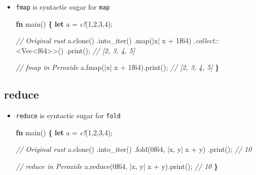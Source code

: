 \documentclass[]{book}
\newenvironment{Shaded}{\begin{snugshade}}{\end{snugshade}}
\newcommand{\CommentTok}[1]{\textcolor[rgb]{0.56,0.35,0.01}{\textit{#1}}}
\newcommand{\DataTypeTok}[1]{\textcolor[rgb]{0.13,0.29,0.53}{#1}}
\newcommand{\DecValTok}[1]{\textcolor[rgb]{0.00,0.00,0.81}{#1}}
\newcommand{\KeywordTok}[1]{\textcolor[rgb]{0.13,0.29,0.53}{\textbf{#1}}}
\newcommand{\NormalTok}[1]{#1}
\newcommand{\OperatorTok}[1]{\textcolor[rgb]{0.81,0.36,0.00}{\textbf{#1}}}
\newcommand{\PreprocessorTok}[1]{\textcolor[rgb]{0.56,0.35,0.01}{\textit{#1}}}
\begin{document}
\begin{itemize}
\item
  \texttt{fmap} is syntactic sugar for \texttt{map}

\begin{Shaded}
\begin{Highlighting}[]
\KeywordTok{fn}\NormalTok{ main() }\OperatorTok{\{}
    \KeywordTok{let}\NormalTok{ a = }\PreprocessorTok{c!}\NormalTok{(}\DecValTok{1}\NormalTok{,}\DecValTok{2}\NormalTok{,}\DecValTok{3}\NormalTok{,}\DecValTok{4}\NormalTok{);}

    \CommentTok{// Original rust}
\NormalTok{    a.clone()}
\NormalTok{        .into_iter()}
\NormalTok{        .map(|x| x + }\DecValTok{1f64}\NormalTok{)}
\NormalTok{        .}\PreprocessorTok{collect::}\NormalTok{<}\DataTypeTok{Vec}\NormalTok{<}\DataTypeTok{f64}\NormalTok{>>()}
\NormalTok{        .print();}
        \CommentTok{// [2, 3, 4, 5]}

    \CommentTok{// fmap in Peroxide}
\NormalTok{    a.fmap(|x| x + }\DecValTok{1f64}\NormalTok{).print();}
    \CommentTok{// [2, 3, 4, 5]}
\OperatorTok{\}}
\end{Highlighting}
\end{Shaded}
\end{itemize}

\hypertarget{reduce}{%
\subsection{reduce}\label{reduce}}

\begin{itemize}
\item
  \texttt{reduce} is syntactic sugar for \texttt{fold}

\begin{Shaded}
\begin{Highlighting}[]
\KeywordTok{fn}\NormalTok{ main() }\OperatorTok{\{}
    \KeywordTok{let}\NormalTok{ a = }\PreprocessorTok{c!}\NormalTok{(}\DecValTok{1}\NormalTok{,}\DecValTok{2}\NormalTok{,}\DecValTok{3}\NormalTok{,}\DecValTok{4}\NormalTok{);}

    \CommentTok{// Original rust}
\NormalTok{    a.clone()}
\NormalTok{        .into_iter()}
\NormalTok{        .fold(}\DecValTok{0f64}\NormalTok{, |x, y| x + y)}
\NormalTok{        .print(); }\CommentTok{// 10}

    \CommentTok{// reduce in Peroxide}
\NormalTok{    a.reduce(}\DecValTok{0f64}\NormalTok{, |x, y| x + y).print(); }\CommentTok{// 10}
\OperatorTok{\}}
\end{Highlighting}
\end{Shaded}
\end{itemize}
\end{document}
